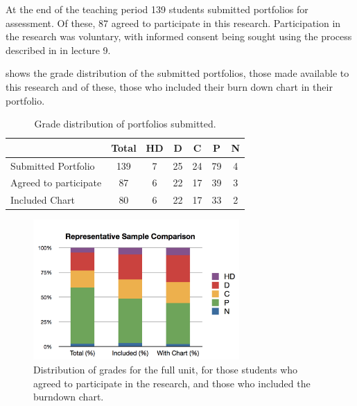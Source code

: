 At the end of the teaching period 139 students submitted portfolios for assessment. Of these, 87 agreed to participate in this research. Participation in the research was voluntary, with informed consent being sought using the process described in  in lecture 9.

 shows the grade distribution of the submitted portfolios, those made available to this research and of these, those who included their burn down chart in their portfolio.

\begin{table}[hbp]
  \footnotesize
  \renewcommand{\arraystretch}{1.3}
  \caption{Grade distribution of portfolios submitted.}
  \label{tbl:progress_student_numbers}
  \centering
  \begin{tabular}{l|c|c|c|c|c|c}
        ~                     & Total & HD & D & C & P & N  \\ \hline
        Submitted Portfolio   & 139    & 7                & 25          & 24     & 79   & 4     \\ %
        Agreed to participate & 87    & 6                & 22          & 17     & 39   & 3     \\ %
        Included Chart & 80 & 6 & 22 & 17 & 33 & 2 \\
  \end{tabular}
\end{table}

\begin{figure}[thbp]
  \centering
  \includegraphics[width=0.7\textwidth]{ProgressGradeDistributions}
  \caption{Distribution of grades for the full unit, for those students who agreed to participate in the research, and those who included the burndown chart.}
  \label{fig:progress_grade_dist}
\end{figure}

